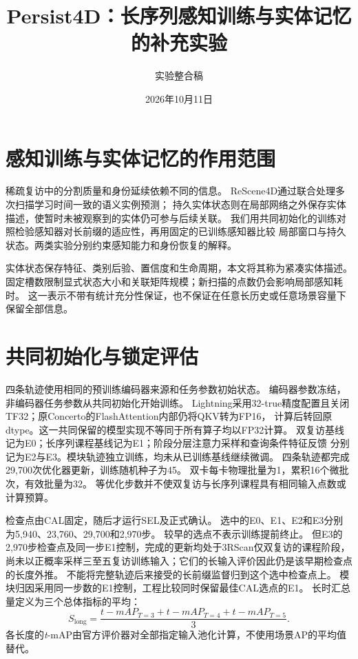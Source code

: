 \documentclass[10pt,twocolumn]{ctexart}
\title{Persist4D：长序列感知训练与实体记忆的补充实验}
\author{实验整合稿}
\date{2026年10月11日}
\newcommand{\tmAP}{\textit{t}-mAP}
\begin{document}
\maketitle

\section{感知训练与实体记忆的作用范围}

稀疏复访中的分割质量和身份延续依赖不同的信息。
ReScene4D通过联合处理多次扫描学习时间一致的语义实例预测\cite{steiner2026rescene4d}；
持久实体状态则在局部网络之外保存实体描述，使暂时未被观察到的实体仍可参与后续关联。
我们用共同初始化的训练对照检验感知器对长前缀的适应性，再用固定的已训练感知器比较
局部窗口与持久状态。两类实验分别约束感知能力和身份恢复的解释。

实体状态保存特征、类别后验、置信度和生命周期，本文将其称为紧凑实体描述。
固定槽数限制显式状态大小和关联矩阵规模；新扫描的点数仍会影响局部感知耗时。
这一表示不带有统计充分性保证，也不保证在任意长历史或任意场景容量下保留全部信息。

\section{共同初始化与锁定评估}

四条轨迹使用相同的预训练编码器来源和任务参数初始状态。
编码器参数冻结，非编码器任务参数从共同初始化开始训练。
Lightning采用32-true精度配置且关闭TF32；原Concerto的FlashAttention内部仍将QKV转为FP16，
计算后转回原dtype。这一共同保留的模型实现不等同于所有算子均以FP32计算。
双复访基线记为E0；长序列课程基线记为E1；阶段分层注意力采样和查询条件特征反馈
分别记为E2与E3。模块轨迹独立训练，均未从已训练基线继续微调。
四条轨迹都完成29,700次优化器更新，训练随机种子为45。
双卡每卡物理批量为1，累积16个微批次，有效批量为32。
等优化步数并不使双复访与长序列课程具有相同输入点数或计算预算。

检查点由CAL固定，随后才运行SEL及正式确认。
选中的E0、E1、E2和E3分别为5,940、23,760、29,700和2,970步。
较早的选点不表示训练提前终止。
但E3的2,970步检查点及同一步E1控制，完成的更新均处于3RScan仅双复访的课程阶段，
尚未以正概率采样三至五复访训练输入；它们的长输入评价因此仍是该早期检查点的长度外推。
不能将完整轨迹后来接受的长前缀监督归到这个选中检查点上。
模块归因采用同一步数的E1控制，工程比较同时保留最佳CAL选点的E1。
长时汇总量定义为三个总体指标的平均：
\begin{equation}
S_{\mathrm{long}}=\frac{\tmAP_{T=3}+\tmAP_{T=4}+\tmAP_{T=5}}{3}.
\end{equation}
各长度的\tmAP{}由官方评价器对全部指定输入池化计算，不使用场景AP的平均值替代。
\end{document}
